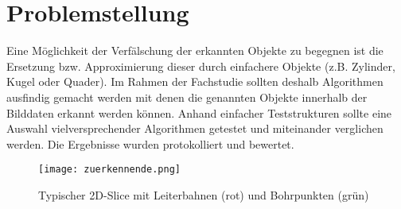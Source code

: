 
\chapter{Problemstellung}
Eine Möglichkeit der Verfälschung der erkannten Objekte zu begegnen ist die Ersetzung bzw. Approximierung dieser durch einfachere Objekte (z.B. Zylinder, Kugel oder Quader). Im Rahmen der Fachstudie sollten deshalb Algorithmen ausfindig gemacht werden mit denen die genannten Objekte innerhalb der Bilddaten erkannt werden können. Anhand einfacher Teststrukturen sollte eine Auswahl vielversprechender Algorithmen getestet und miteinander verglichen werden. Die Ergebnisse wurden protokolliert und bewertet.

\begin{figure}[H]
  \begin{center}
    \texttt{[image: zuerkennende.png]}
    \caption{Typischer 2D-Slice mit Leiterbahnen (rot) und Bohrpunkten (grün)}
    \label{fig:zuerkennende1}
  \end{center}
\end{figure}

